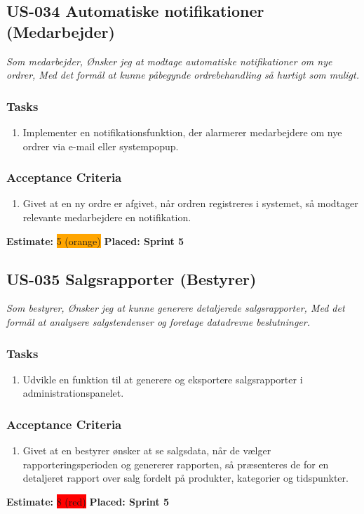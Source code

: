 \subsection{US-034 Automatiske notifikationer (Medarbejder)}
\label{sec:US-034}
\textit{Som medarbejder, Ønsker jeg at modtage automatiske notifikationer om nye ordrer, Med det formål at kunne påbegynde ordrebehandling så hurtigt som muligt.}
\subsubsection*{\textbf{Tasks}}
\begin{enumerate}
  \item Implementer en notifikationsfunktion, der alarmerer medarbejdere om nye ordrer via e-mail eller systempopup.
\end{enumerate}
\subsubsection*{\textbf{Acceptance Criteria}}
\begin{enumerate}
  \item Givet at en ny ordre er afgivet, når ordren registreres i systemet, så modtager relevante medarbejdere en notifikation.
\end{enumerate}
\textbf{Estimate:} \colorbox{orange}{5 (orange)}
\textbf{Placed: Sprint 5}
\par\noindent\dotfill

\subsection{US-035 Salgsrapporter (Bestyrer)}
\label{sec:US-035}
\textit{Som bestyrer, Ønsker jeg at kunne generere detaljerede salgsrapporter, Med det formål at analysere salgstendenser og foretage datadrevne beslutninger.}
\subsubsection*{\textbf{Tasks}}
\begin{enumerate}
  \item Udvikle en funktion til at generere og eksportere salgsrapporter i administrationspanelet.
\end{enumerate}
\subsubsection*{\textbf{Acceptance Criteria}}
\begin{enumerate}
  \item Givet at en bestyrer ønsker at se salgsdata, når de vælger rapporteringsperioden og genererer rapporten, så præsenteres de for en detaljeret rapport over salg fordelt på produkter, kategorier og tidspunkter.
\end{enumerate}
\textbf{Estimate:} \colorbox{red}{8 (red)}
\textbf{Placed: Sprint 5}
\par\noindent\dotfill

